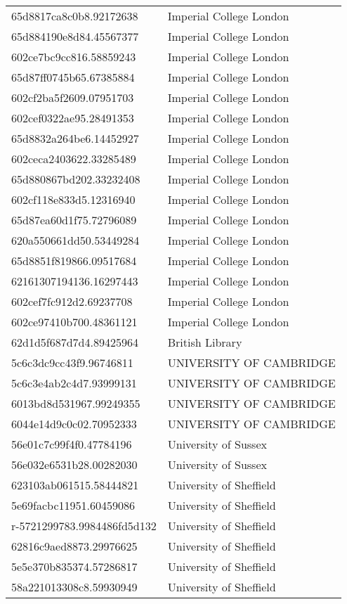 \begin{tabular}{ll}
65d8817ca8c0b8.92172638 & Imperial College London \\
65d884190e8d84.45567377 & Imperial College London \\
602ce7bc9cc816.58859243 & Imperial College London \\
65d87ff0745b65.67385884 & Imperial College London \\
602cf2ba5f2609.07951703 & Imperial College London \\
602cef0322ae95.28491353 & Imperial College London \\
65d8832a264be6.14452927 & Imperial College London \\
602ceca2403622.33285489 & Imperial College London \\
65d880867bd202.33232408 & Imperial College London \\
602cf118e833d5.12316940 & Imperial College London \\
65d87ea60d1f75.72796089 & Imperial College London \\
620a550661dd50.53449284 & Imperial College London \\
65d8851f819866.09517684 & Imperial College London \\
62161307194136.16297443 & Imperial College London \\
602cef7fc912d2.69237708 & Imperial College London \\
602ce97410b700.48361121 & Imperial College London \\
62d1d5f687d7d4.89425964 & British Library \\
5c6c3dc9cc43f9.96746811 & UNIVERSITY OF CAMBRIDGE \\
5c6c3e4ab2c4d7.93999131 & UNIVERSITY OF CAMBRIDGE \\
6013bd8d531967.99249355 & UNIVERSITY OF CAMBRIDGE \\
6044e14d9c0c02.70952333 & UNIVERSITY OF CAMBRIDGE \\
56e01c7c99f4f0.47784196 & University of Sussex \\
56e032e6531b28.00282030 & University of Sussex \\
623103ab061515.58444821 & University of Sheffield \\
5e69facbc11951.60459086 & University of Sheffield \\
r-5721299783.9984486fd5d132 & University of Sheffield \\
62816c9aed8873.29976625 & University of Sheffield \\
5e5e370b835374.57286817 & University of Sheffield \\
58a221013308c8.59930949 & University of Sheffield \\

\end{tabular}
